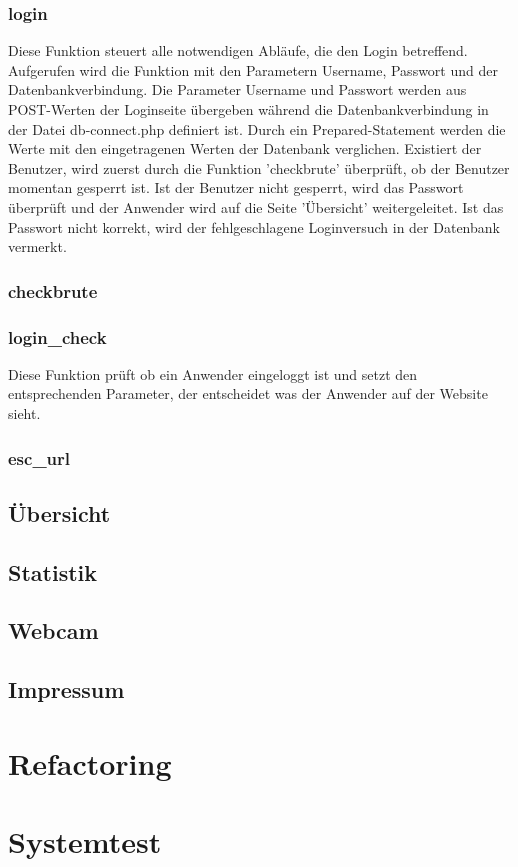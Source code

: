 \subsubsection{login}
Diese Funktion steuert alle notwendigen Abläufe, die den Login betreffend.\\
Aufgerufen wird die Funktion mit den Parametern Username, Passwort und der Datenbankverbindung. Die Parameter Username und Passwort werden aus POST-Werten der Loginseite übergeben während die Datenbankverbindung in der Datei db-connect.php definiert ist. 
Durch ein Prepared-Statement werden die Werte mit den eingetragenen Werten der Datenbank verglichen. Existiert der Benutzer, wird zuerst durch die Funktion 'checkbrute' überprüft, ob der Benutzer momentan gesperrt ist. Ist der Benutzer nicht gesperrt, wird das Passwort überprüft und der Anwender wird auf die Seite 'Übersicht' weitergeleitet. Ist das Passwort nicht korrekt, wird der fehlgeschlagene Loginversuch in der Datenbank vermerkt.

\subsubsection{checkbrute}

\subsubsection{login\_check}
Diese Funktion prüft ob ein Anwender eingeloggt ist und setzt den entsprechenden
Parameter, der entscheidet was der Anwender auf der Website sieht.

\subsubsection{esc\_url}

\subsection{Übersicht}
\subsection{Statistik}
\subsection{Webcam}
\subsection{Impressum}
\section{Refactoring}
\section{Systemtest}
